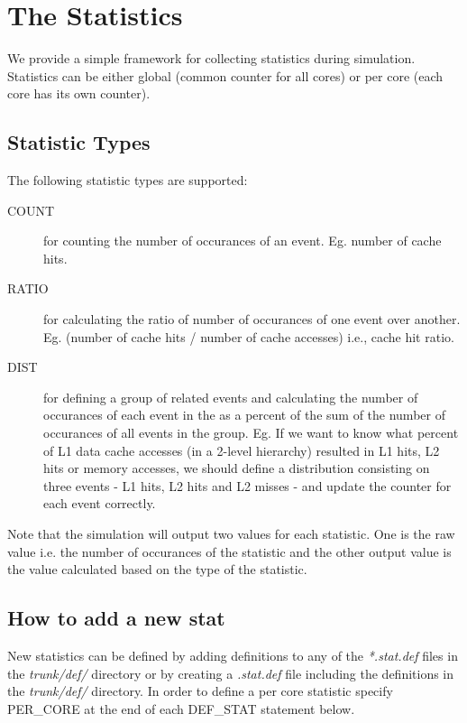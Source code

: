 \clearpage
\section{The Statistics}
\label{sec:stat}

We provide a simple framework for collecting statistics during simulation.
Statistics can be either global (common counter for all cores) or per core
(each core has its own counter).

\subsection{Statistic Types}

The following statistic types are supported:

\begin{description}

  \item [COUNT] for counting the number of occurances of an event. Eg. number
  of cache hits. 

  \item [RATIO] for calculating the ratio of number of occurances of one event
  over another. Eg. (number of cache hits / number of cache accesses) i.e.,
  cache hit ratio.

  \item [DIST]  for defining a group of related events and calculating the
  number of occurances of each event in the as a percent of the sum of the
  number of occurances of all events in the group.  Eg. If we want to know what
  percent of L1 data cache accesses (in a 2-level hierarchy) resulted in L1
  hits, L2 hits or memory accesses, we should define a distribution consisting
  on three events - L1 hits, L2 hits and L2 misses  - and update the
  counter for each event correctly. 

\end{description}


Note that the simulation will output two values for each statistic. One is the
raw value i.e. the number of occurances of the statistic and the other output
value is the value calculated based on the type of the statistic.


\subsection{How to add a new stat}

New statistics can be defined by adding definitions to any of the
\textit{*.stat.def} files in the \textit{trunk/def/} directory or by creating a
\textit{.stat.def} file including the definitions in the \textit{trunk/def/}
directory.  In order to define a per core statistic specify PER\_CORE at the
end of each DEF\_STAT statement below.



